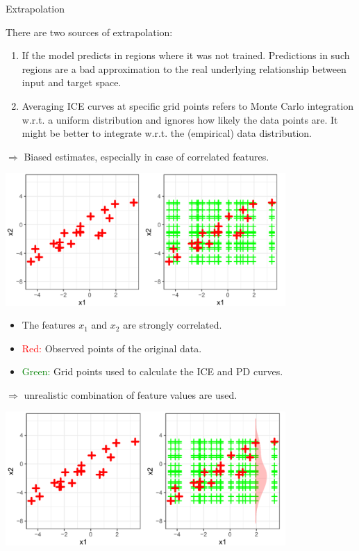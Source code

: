 \documentclass[11pt,compress,t,notes=noshow, xcolor=table]{beamer}
\begin{document}
\begin{vbframe}{Extrapolation}

There are two sources of extrapolation:
\lz
\begin{enumerate}
  \item If the model predicts in regions where it was not trained. Predictions in such regions are a bad approximation to the real underlying relationship between input and target space.
  \lz
  \item Averaging ICE curves at specific grid points refers to Monte Carlo integration w.r.t. a   uniform distribution and ignores how likely the data points are.
  It might be better to integrate w.r.t. the (empirical) data distribution.
\end{enumerate}
\lz
$\Rightarrow$ Biased estimates, especially in case of correlated features.

\framebreak

\begin{center}
\includegraphics[width=0.8\textwidth]{figure_man/extrapolation01.png}
\end{center}

\begin{itemize}
\item The features $x_1$ and $x_2$ are strongly correlated.
\item \textcolor{red}{Red:} Observed points of the original data.
\item \textcolor{green}{Green:} Grid points used to calculate the ICE and PD curves.
\end{itemize}
$\Rightarrow$ unrealistic combination of feature values are used.

\framebreak


\begin{center}
\includegraphics[width=0.8\textwidth]{figure_man/extrapolation02.png}
\end{center}


\end{vbframe}
\end{document}
